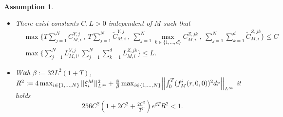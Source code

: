 \documentclass[10pt,a4paper]{article}
\theoremstyle{plain}
\newtheorem{Assumption}[Theorem]{Assumption}
\theoremstyle{definition}
\numberwithin{equation}{section}
\begin{document}
\begin{Assumption}
\begin{itemize}

\item[\textnormal{(iii)}] There exist constants $C,L>0$ independent of $M$ such that 
\begin{align*}
&\max \Biggl\{T\sum_{j=1}^{N}C_{M,i}^{Y,j} \ , \ T\sum_{j=1}^{N}\tilde{C}_{M,i}^{Y,j} \ , \ \sum_{j=1}^{N}\max_{k \in \{1,...,d\}}C_{M,i}^{Z,jk} \ , \ \sum_{j=1}^{N}\sum_{k=1}^{d}\tilde{C}_{M,i}^{Z,jk}\Biggr\} \leq C\\
& \max\biggl\{\sum_{j=1}^{N}L_{M,i}^{Y,j},\sum_{j=1}^{N}\sum_{k=1}^{d}L_{M,i}^{Z,jk}\biggr\} \leq L.
\end{align*}

\item[\textnormal{(iv)}] With $\beta := 32L^{2}(1+T)$, $R^{2}:= 4\max_{i \in \{1,...,N\}}||\xi_{i}^{M}||_{L^{\infty}}^{2} + \tfrac{8}{\beta}\max_{i \in \{1,...,N\}}\Bigl|\Bigl|\int_{0}^{T}(f_{M}^{i}(r,0,0))^{2}dr\Bigr|\Bigr|_{L^{\infty}}$ it holds
\[
256C^{2}(1+2C^{2}+\tfrac{2C^{2}}{T^{2}})e^{\beta T}R^{2} < 1.
\]

\end{itemize}

\end{Assumption}
\end{document}
